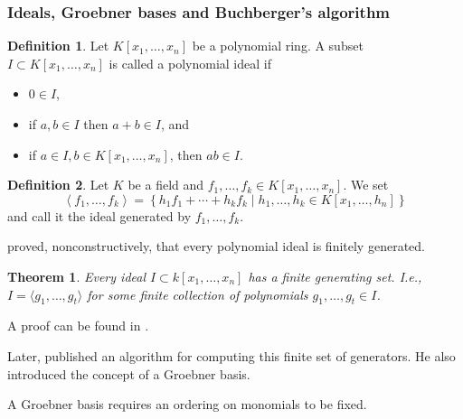 \documentclass[
]{book}
\providecommand{\tightlist}{%
  \setlength{\itemsep}{0pt}\setlength{\parskip}{0pt}}
\newtheorem{theorem}{Theorem}[chapter]
\theoremstyle{definition}
\newtheorem{definition}{Definition}[chapter]
\theoremstyle{definition}
\theoremstyle{definition}
\theoremstyle{definition}
\theoremstyle{remark}
\begin{document}
\hypertarget{ideals-groebner-bases-and-buchbergers-algorithm}{%
\subsubsection{Ideals, Groebner bases and Buchberger's algorithm}\label{ideals-groebner-bases-and-buchbergers-algorithm}}

\begin{definition}

Let \(K[x_1,\ldots,x_n]\) be a polynomial ring. A subset \(I \subset K[x_1,\ldots,x_n]\) is called a polynomial ideal if

\begin{itemize}
\tightlist
\item
  \(0 \in I\),
\item
  if \(a,b \in I\) then \(a+b \in I\), and
\item
  if \(a \in I, b \in K[x_1,\ldots,x_n]\), then \(ab \in I\).
\end{itemize}

\end{definition}

\begin{definition}
Let \(K\) be a field and \(f_1,\ldots, f_k \in K[x_1,\ldots,x_n]\). We set
\[
\left\langle f_{1},\ldots,f_{k}\right\rangle =\left\{ h_{1}f_{1}+\cdots+h_{k}f_{k}\mid h_{1},\ldots,h_{k}\in K[x_{1},\ldots,h_{n}]\right\}
\]
and call it the ideal generated by \(f_1,\ldots,f_k\).
\end{definition}

\citet{hilbert1890} proved, nonconstructively, that every polynomial ideal is finitely generated.

\begin{theorem}
Every ideal \(I \subset k[x_1, \ldots, x_n]\) has a finite generating set. I.e., \(I = \langle g_1, \ldots, g_t\rangle\) for some finite collection of polynomials \(g_1, \ldots, g_t\in I\).
\end{theorem}

A proof can be found in \citep[p76]{cox2013}.

Later, \citet{buchberger1965} published an algorithm for computing this finite set of generators. He also introduced the concept of a Groebner basis.

A Groebner basis requires an ordering on monomials to be fixed.
\end{document}
